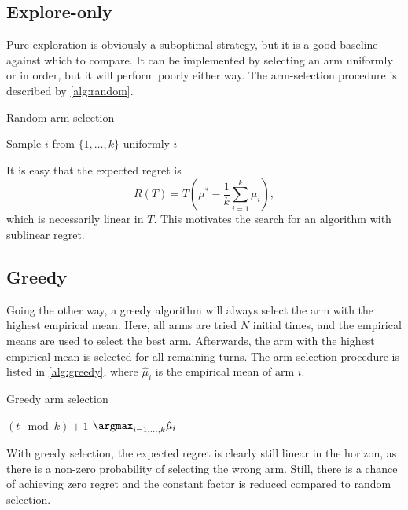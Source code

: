 \subsection{Explore-only}
Pure exploration is obviously a suboptimal strategy, but it is a good baseline against which to compare.
It can be implemented by selecting an arm uniformly or in order, but it will perform poorly either way.
The arm-selection procedure is described by \cref{alg:random}.
\begin{algorithm}
    \caption{Random arm selection}
    \label{alg:random}
    \begin{algorithmic}
        \State Sample $i$ from $\{1,\dots, k\}$ uniformly
        \State \Return $i$
    \end{algorithmic}
\end{algorithm}

It is easy that the expected regret is
\begin{equation}
    R(T) = T\left(\mu^* - \frac{1}{k}\sum_{i=1}^k \mu_i\right),
\end{equation}
which is necessarily linear in $T$.
This motivates the search for an algorithm with sublinear regret.

\subsection{Greedy}
Going the other way, a greedy algorithm will always select the arm with the highest empirical mean.
Here, all arms are tried $N$ initial times, and the empirical means are used to select the best arm.
Afterwards, the arm with the highest empirical mean is selected for all remaining turns.
The arm-selection procedure is listed in \cref{alg:greedy}, where $\hat{\mu}_i$ is the empirical mean of arm $i$.
\begin{algorithm}
    \caption{Greedy arm selection}
    \label{alg:greedy}
    \begin{algorithmic}
        \State \Return $(t \mod k) + 1$
        \Else
        \State \Return $\argmax_{i=1,\dots,k} \hat{\mu}_i$
        \EndIf
    \end{algorithmic}
\end{algorithm}

With greedy selection, the expected regret is clearly still linear in the horizon, as there is a non-zero probability of selecting the wrong arm.
Still, there is a chance of achieving zero regret and the constant factor is reduced compared to random selection.


